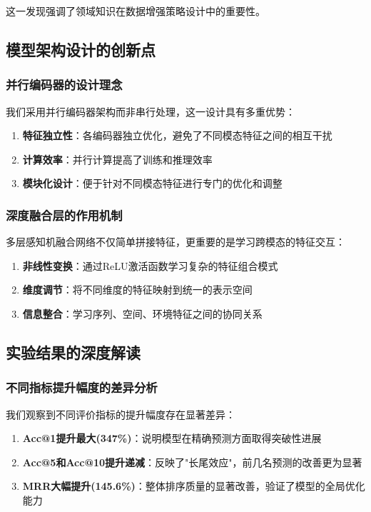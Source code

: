 \documentclass{article}
\begin{document}
这一发现强调了领域知识在数据增强策略设计中的重要性。

\subsection{模型架构设计的创新点}

\subsubsection{并行编码器的设计理念}

我们采用并行编码器架构而非串行处理，这一设计具有多重优势：

\begin{enumerate}
\item \textbf{特征独立性}：各编码器独立优化，避免了不同模态特征之间的相互干扰
\item \textbf{计算效率}：并行计算提高了训练和推理效率
\item \textbf{模块化设计}：便于针对不同模态特征进行专门的优化和调整
\end{enumerate}

\subsubsection{深度融合层的作用机制}

多层感知机融合网络不仅简单拼接特征，更重要的是学习跨模态的特征交互：

\begin{enumerate}
\item \textbf{非线性变换}：通过ReLU激活函数学习复杂的特征组合模式
\item \textbf{维度调节}：将不同维度的特征映射到统一的表示空间
\item \textbf{信息整合}：学习序列、空间、环境特征之间的协同关系
\end{enumerate}

\subsection{实验结果的深度解读}

\subsubsection{不同指标提升幅度的差异分析}

我们观察到不同评价指标的提升幅度存在显著差异：

\begin{enumerate}
\item \textbf{Acc@1提升最大(347\%)}：说明模型在精确预测方面取得突破性进展
\item \textbf{Acc@5和Acc@10提升递减}：反映了"长尾效应"，前几名预测的改善更为显著
\item \textbf{MRR大幅提升(145.6\%)}：整体排序质量的显著改善，验证了模型的全局优化能力
\end{enumerate}
\end{document}
